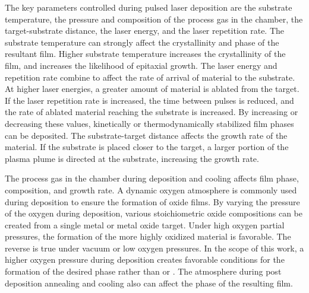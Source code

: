 The key parameters controlled during pulsed laser deposition are the substrate
temperature, the pressure and composition of the process gas in the chamber, the
target-substrate distance, the laser energy, and the laser repetition rate. The substrate
temperature can strongly affect the crystallinity and phase of the resultant film. Higher
substrate temperature increases the crystallinity of the film, and increases the
likelihood of epitaxial growth.\cite{Francis:2004cf} The laser energy and repetition rate
combine to affect the rate of arrival of material to the substrate. At higher laser
energies, a greater amount of material is ablated from the target. If the laser repetition
rate is increased, the time between pulses is reduced, and the rate of ablated material
reaching the substrate is increased. By increasing or decreasing these values, kinetically
or thermodynamically stabilized film phases can be deposited. The substrate-target
distance affects the growth rate of the material. If the substrate is placed closer to the
target, a larger portion of the plasma plume is directed at the substrate, increasing the
growth rate. 

The process gas in the chamber during deposition and cooling affects film phase,
composition, and growth rate. A dynamic oxygen atmosphere is commonly used during
deposition to ensure the formation of oxide films. By varying the pressure of the oxygen
during deposition, various stoichiometric oxide compositions can be created from a single
metal or metal oxide target. Under high oxygen partial pressures, the formation of the
more highly oxidized material is favorable. The reverse is true under vacuum or low oxygen
pressures. In the scope of this work, a higher oxygen pressure during deposition creates
favorable conditions for the formation of the desired  phase rather than
 or . The atmosphere during post deposition annealing and cooling also
can affect the phase of the resulting film.

